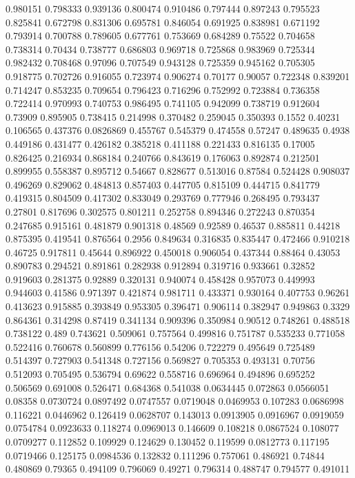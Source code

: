 0.980151 0.798333
0.939136 0.800474
0.910486 0.797444
0.897243 0.795523
0.825841 0.672798
0.831306 0.695781
0.846054 0.691925
0.838981 0.671192
0.793914 0.700788
0.789605 0.677761
0.753669 0.684289
0.75522 0.704658
0.738314 0.70434
0.738777 0.686803
0.969718 0.725868
0.983969 0.725344
0.982432 0.708468
0.97096 0.707549
0.943128 0.725359
0.945162 0.705305
0.918775 0.702726
0.916055 0.723974
0.906274 0.70177
0.90057 0.722348
0.839201 0.714247
0.853235 0.709654
0.796423 0.716296
0.752992 0.723884
0.736358 0.722414
0.970993 0.740753
0.986495 0.741105
0.942099 0.738719
0.912604 0.73909
0.895905 0.738415
0.214998 0.370482
0.259045 0.350393
0.1552 0.40231
0.106565 0.437376
0.0826869 0.455767
0.545379 0.474558
0.57247 0.489635
0.4938 0.449186
0.431477 0.426182
0.385218 0.411188
0.221433 0.816135
0.17005 0.826425
0.216934 0.868184
0.240766 0.843619
0.176063 0.892874
0.212501 0.899955
0.558387 0.895712
0.54667 0.828677
0.513016 0.87584
0.524428 0.908037
0.496269 0.829062
0.484813 0.857403
0.447705 0.815109
0.444715 0.841779
0.419315 0.804509
0.417302 0.833049
0.293769 0.777946
0.268495 0.793437
0.27801 0.817696
0.302575 0.801211
0.252758 0.894346
0.272243 0.870354
0.247685 0.915161
0.481879 0.901318
0.48569 0.92589
0.46537 0.885811
0.44218 0.875395
0.419541 0.876564
0.2956 0.849634
0.316835 0.835447
0.472466 0.910218
0.46725 0.917811
0.45644 0.896922
0.450018 0.906054
0.437344 0.88464
0.43053 0.890783
0.294521 0.891861
0.282938 0.912894
0.319716 0.933661
0.32852 0.919603
0.281375 0.92889
0.320131 0.940074
0.458428 0.957073
0.449993 0.944603
0.41586 0.971397
0.421874 0.981711
0.433371 0.930164
0.407753 0.96261
0.413623 0.915885
0.393849 0.953305
0.396471 0.906114
0.382947 0.949863
0.3329 0.864361
0.314298 0.87419
0.341134 0.909396
0.350984 0.90512
0.748261 0.488518
0.738122 0.489
0.743621 0.509061
0.757564 0.499816
0.751787 0.535233
0.771058 0.522416
0.760678 0.560899
0.776156 0.54206
0.722279 0.495649
0.725489 0.514397
0.727903 0.541348
0.727156 0.569827
0.705353 0.493131
0.70756 0.512093
0.705495 0.536794
0.69622 0.558716
0.696964 0.494896
0.695252 0.506569
0.691008 0.526471
0.684368 0.541038
0.0634445 0.072863
0.0566051 0.08358
0.0730724 0.0897492
0.0747557 0.0719048
0.0469953 0.107283
0.0686998 0.116221
0.0446962 0.126419
0.0628707 0.143013
0.0913905 0.0916967
0.0919059 0.0754784
0.0923633 0.118274
0.0969013 0.146609
0.108218 0.0867524
0.108077 0.0709277
0.112852 0.109929
0.124629 0.130452
0.119599 0.0812773
0.117195 0.0719466
0.125175 0.0984536
0.132832 0.111296
0.757061 0.486921
0.74844 0.480869
0.79365 0.494109
0.796069 0.49271
0.796314 0.488747
0.794577 0.491011
